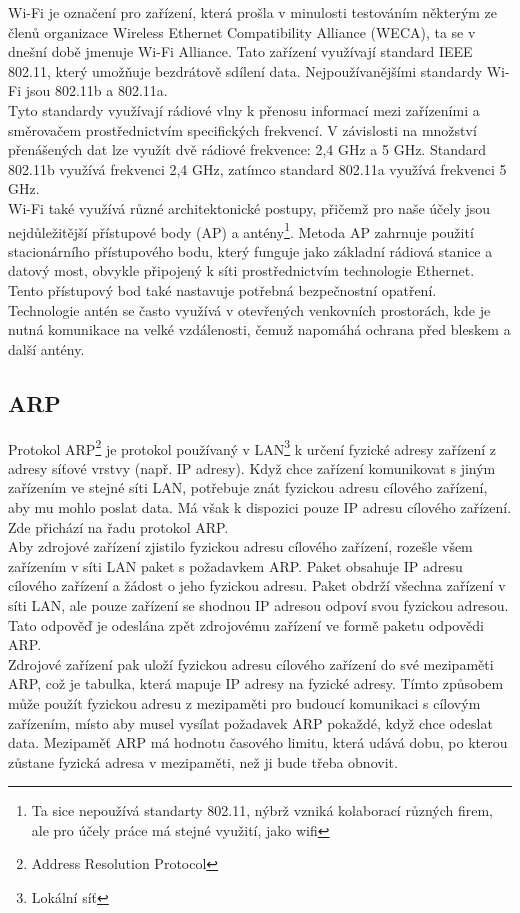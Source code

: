 \documentclass[12pt]{report}			%
\begin{document}
Wi-Fi je označení pro zařízení, která prošla v minulosti testováním některým ze členů organizace Wireless Ethernet Compatibility Alliance (WECA), ta se v dnešní době jmenuje Wi-Fi Alliance. Tato zařízení využívají standard IEEE 802.11, který umožňuje bezdrátově sdílení data. Nejpoužívanějšími standardy Wi-Fi jsou 802.11b a 802.11a.
\\
Tyto standardy využívají rádiové vlny k přenosu informací mezi zařízeními a směrovačem prostřednictvím specifických frekvencí. V závislosti na množství přenášených dat lze využít dvě rádiové frekvence: 2,4 GHz a 5 GHz. Standard 802.11b využívá frekvenci 2,4 GHz, zatímco standard 802.11a využívá frekvenci 5 GHz.
\\
Wi-Fi také využívá různé architektonické postupy, přičemž pro naše účely jsou nejdůležitější přístupové body (AP) a antény\footnote{Ta sice nepoužívá standarty 802.11, nýbrž vzniká kolaborací různých firem, ale pro účely práce má stejné využití, jako wifi}. Metoda AP zahrnuje použití stacionárního přístupového bodu, který funguje jako základní rádiová stanice a datový most, obvykle připojený k síti prostřednictvím technologie Ethernet. Tento přístupový bod také nastavuje potřebná bezpečnostní opatření.
\\
Technologie antén se často využívá v otevřených venkovních prostorách, kde je nutná komunikace na velké vzdálenosti, čemuž napomáhá ochrana před bleskem a další antény.



\cite{WiFi_1}
\cite{WiFi_2}
\cite{WiFi_3}
\cite{Pruvodce}
				\subsection{ARP}
Protokol ARP\footnote{Address Resolution Protocol} je protokol používaný v LAN\footnote{Lokální síť} k určení fyzické adresy zařízení z adresy síťové vrstvy (např. IP adresy). Když chce zařízení komunikovat s jiným zařízením ve stejné síti LAN, potřebuje znát fyzickou adresu cílového zařízení, aby mu mohlo poslat data. Má však k dispozici pouze IP adresu cílového zařízení. Zde přichází na řadu protokol ARP.
\\
Aby zdrojové zařízení zjistilo fyzickou adresu cílového zařízení, rozešle všem zařízením v síti LAN paket s požadavkem ARP. Paket obsahuje IP adresu cílového zařízení a žádost o jeho fyzickou adresu. Paket obdrží všechna zařízení v síti LAN, ale pouze zařízení se shodnou IP adresou odpoví svou fyzickou adresou. Tato odpověď je odeslána zpět zdrojovému zařízení ve formě paketu odpovědi ARP.
\\
Zdrojové zařízení pak uloží fyzickou adresu cílového zařízení do své mezipaměti ARP, což je tabulka, která mapuje IP adresy na fyzické adresy. Tímto způsobem může použít fyzickou adresu z mezipaměti pro budoucí komunikaci s cílovým zařízením, místo aby musel vysílat požadavek ARP pokaždé, když chce odeslat data. Mezipaměť ARP má hodnotu časového limitu, která udává dobu, po kterou zůstane fyzická adresa v mezipaměti, než ji bude třeba obnovit.
\end{document}
